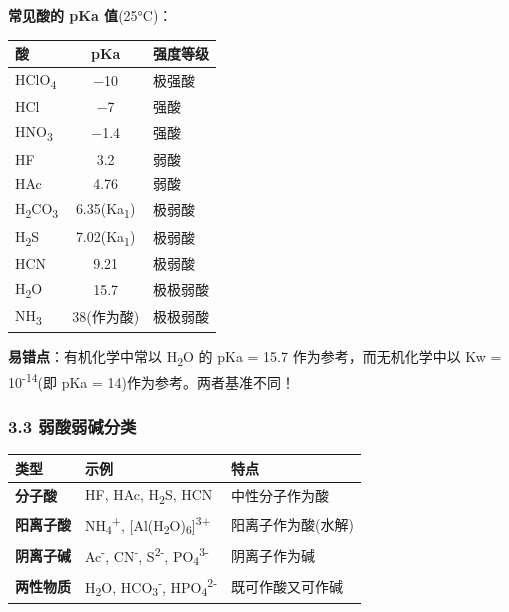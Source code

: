 \documentclass[a4paper,11pt]{ctexart}
\newcounter{none}
\begin{document}
\textbf{常见酸的 pKa 值}(25°C)：

{\def\LTcaptype{none} %
\begin{longtable}[]{@{}lcl@{}}
\toprule\noalign{}
酸 & pKa & 强度等级 \\
\midrule\noalign{}
\endhead
\bottomrule\noalign{}
\endlastfoot
HClO\textsubscript{4} & −10 & 极强酸 \\
HCl & −7 & 强酸 \\
HNO\textsubscript{3} & −1.4 & 强酸 \\
HF & 3.2 & 弱酸 \\
HAc & 4.76 & 弱酸 \\
H\textsubscript{2}CO\textsubscript{3} & 6.35(Ka\textsubscript{1}) & 极弱酸 \\
H\textsubscript{2}S & 7.02(Ka\textsubscript{1}) & 极弱酸 \\
HCN & 9.21 & 极弱酸 \\
H\textsubscript{2}O & 15.7 & 极极弱酸 \\
NH\textsubscript{3} & 38(作为酸) & 极极弱酸 \\
\end{longtable}
}

\textbf{易错点}：有机化学中常以 H\textsubscript{2}O 的 pKa = 15.7 作为参考，而无机化学中以 Kw = 10\textsuperscript{-14}(即 pKa = 14)作为参考。两者基准不同！

\subsubsection{3.3 弱酸弱碱分类}\label{ux5f31ux9178ux5f31ux78b1ux5206ux7c7b}

{\def\LTcaptype{none} %
\begin{longtable}[]{@{}lll@{}}
\toprule\noalign{}
类型 & 示例 & 特点 \\
\midrule\noalign{}
\endhead
\bottomrule\noalign{}
\endlastfoot
\textbf{分子酸} & HF, HAc, H\textsubscript{2}S, HCN & 中性分子作为酸 \\
\textbf{阳离子酸} & NH\textsubscript{4}\textsuperscript{+}, {[}Al(H\textsubscript{2}O)\textsubscript{6}{]}\textsuperscript{3+} & 阳离子作为酸(水解) \\
\textbf{阴离子碱} & Ac\textsuperscript{-}, CN\textsuperscript{-}, S\textsuperscript{2-}, PO\textsubscript{4}\textsuperscript{3-} & 阴离子作为碱 \\
\textbf{两性物质} & H\textsubscript{2}O, HCO\textsubscript{3}\textsuperscript{-}, HPO\textsubscript{4}\textsuperscript{2-} & 既可作酸又可作碱 \\
\end{longtable}
}
\end{document}
